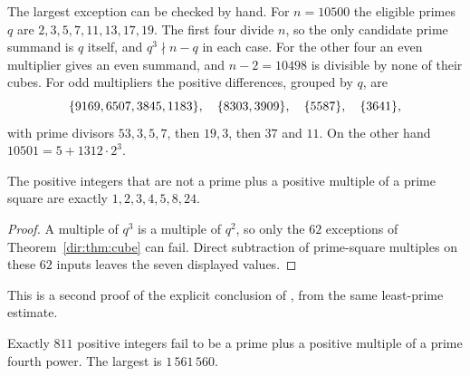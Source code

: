 The largest exception can be checked by hand. For $n=10500$ the eligible primes $q$ are
$2,3,5,7,11,13,17,19$. The first four divide $n$, so the only candidate prime summand
is $q$ itself, and $q^3\nmid n-q$ in each case. For the other four an even multiplier
gives an even summand, and $n-2=10498$ is divisible by none of their cubes. For odd
multipliers the positive differences, grouped by $q$, are
\[
 \{9169,6507,3845,1183\},\quad\{8303,3909\},\quad\{5587\},\quad\{3641\},
\]
with prime divisors $53,3,5,7$, then $19,3$, then $37$ and $11$. On the other hand
$10501=5+1312\cdot2^3$.

\begin{corollary}\label{dir:cor:square}
The positive integers that are not a prime plus a positive multiple of a prime square
are exactly $1,2,3,4,5,8,24$.
\end{corollary}

\begin{proof}
A multiple of $q^3$ is a multiple of $q^2$, so only the $62$ exceptions of
Theorem~\ref{dir:thm:cube} can fail. Direct subtraction of prime-square multiples on these
$62$ inputs leaves the seven displayed values.
\end{proof}

This is a second proof of the explicit conclusion of \cite{LeeOClarey2026Prime}, from
the same least-prime estimate.

\begin{theorem}\label{dir:thm:fourth}
Exactly $811$ positive integers fail to be a prime plus a positive multiple of a prime
fourth power. The largest is $1\,561\,560$.
\end{theorem}

